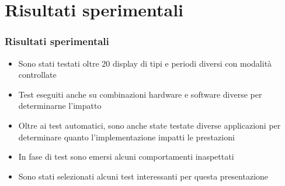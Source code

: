 \documentclass[xcolor={x11names}]{beamer}
\begin{document}
\section{Risultati sperimentali}
\begin{frame}
	\frametitle{Risultati sperimentali}
	\begin{itemize}
		\item Sono stati testati \alert{oltre 20 display di tipi e periodi diversi} con modalità controllate
		\item Test eseguiti anche su \alert{combinazioni hardware e software diverse} per determinarne l'impatto
		\item Oltre ai test automatici, sono anche state \alert{testate diverse applicazioni} per determinare quanto l'implementazione impatti le prestazioni
		\item In fase di test sono emersi \alert{alcuni comportamenti inaspettati}
		\item Sono stati selezionati alcuni test interessanti per questa presentazione
	\end{itemize}
\end{frame}
\end{document}
